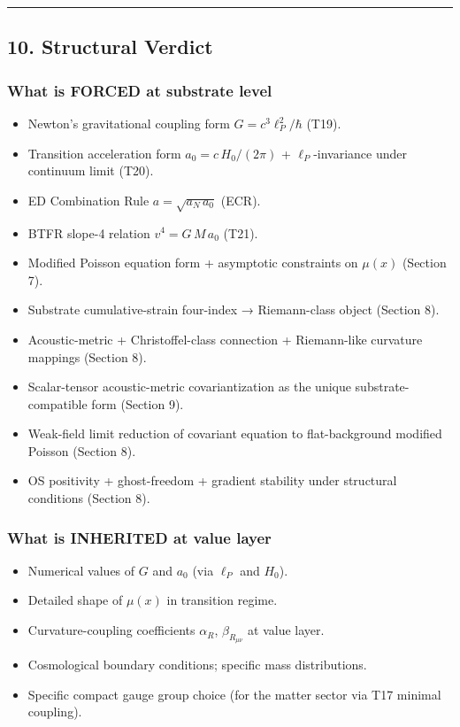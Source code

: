 \documentclass[
  11pt,a4paper]{article}
\providecommand{\tightlist}{%
  \setlength{\itemsep}{0pt}\setlength{\parskip}{0pt}}
\begin{document}
\begin{center}\rule{0.5\linewidth}{0.5pt}\end{center}

\subsection{10. Structural Verdict}\label{structural-verdict}

\subsubsection{What is FORCED at substrate
level}\label{what-is-forced-at-substrate-level}

\begin{itemize}
\tightlist
\item
  Newton's gravitational coupling form \(G = c^3\ell_P^2/\hbar\) (T19).
\item
  Transition acceleration form \(a_0 = c\,H_0/(2\pi)\) +
  \(\ell_P\)-invariance under continuum limit (T20).
\item
  ED Combination Rule \(a = \sqrt{a_N\,a_0}\) (ECR).
\item
  BTFR slope-4 relation \(v^4 = G\,M\,a_0\) (T21).
\item
  Modified Poisson equation form + asymptotic constraints on \(\mu(x)\)
  (Section 7).
\item
  Substrate cumulative-strain four-index → Riemann-class object (Section
  8).
\item
  Acoustic-metric + Christoffel-class connection + Riemann-like
  curvature mappings (Section 8).
\item
  Scalar-tensor acoustic-metric covariantization as the unique
  substrate-compatible form (Section 9).
\item
  Weak-field limit reduction of covariant equation to flat-background
  modified Poisson (Section 8).
\item
  OS positivity + ghost-freedom + gradient stability under structural
  conditions (Section 8).
\end{itemize}

\subsubsection{What is INHERITED at value
layer}\label{what-is-inherited-at-value-layer}

\begin{itemize}
\tightlist
\item
  Numerical values of \(G\) and \(a_0\) (via \(\ell_P\) and \(H_0\)).
\item
  Detailed shape of \(\mu(x)\) in transition regime.
\item
  Curvature-coupling coefficients \(\alpha_R\), \(\beta_{R_{\mu\nu}}\)
  at value layer.
\item
  Cosmological boundary conditions; specific mass distributions.
\item
  Specific compact gauge group choice (for the matter sector via T17
  minimal coupling).
\end{itemize}
\end{document}
